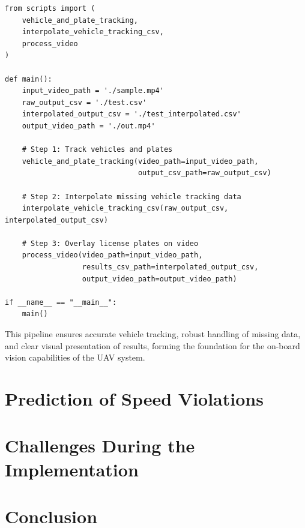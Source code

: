 \begin{verbatim}
from scripts import (
    vehicle_and_plate_tracking,
    interpolate_vehicle_tracking_csv,
    process_video
)

def main():
    input_video_path = './sample.mp4'
    raw_output_csv = './test.csv'
    interpolated_output_csv = './test_interpolated.csv'
    output_video_path = './out.mp4'
    
    # Step 1: Track vehicles and plates
    vehicle_and_plate_tracking(video_path=input_video_path,
                               output_csv_path=raw_output_csv)

    # Step 2: Interpolate missing vehicle tracking data
    interpolate_vehicle_tracking_csv(raw_output_csv, interpolated_output_csv)

    # Step 3: Overlay license plates on video
    process_video(video_path=input_video_path,
                  results_csv_path=interpolated_output_csv,
                  output_video_path=output_video_path)

if __name__ == "__main__":
    main()
\end{verbatim}

This pipeline ensures accurate vehicle tracking, robust handling of missing data, and clear visual presentation of results, forming the foundation for the on-board vision capabilities of the UAV system.



\section{Prediction of Speed Violations}


\section{Challenges During the Implementation}


\section*{Conclusion}